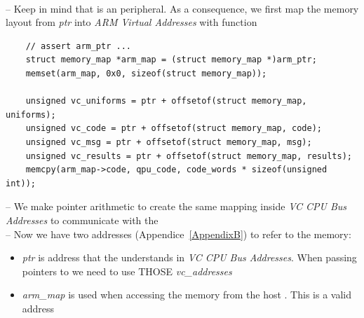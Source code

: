 \\
-- Keep in mind that \vc{} is an \cpu{} peripheral. As a consequence, we first map the memory layout from \emph{ptr} into \emph{ARM Virtual Addresses} with  function\\

\begin{lstlisting}
    // assert arm_ptr ...
    struct memory_map *arm_map = (struct memory_map *)arm_ptr;
    memset(arm_map, 0x0, sizeof(struct memory_map));

    unsigned vc_uniforms = ptr + offsetof(struct memory_map, uniforms);
    unsigned vc_code = ptr + offsetof(struct memory_map, code);
    unsigned vc_msg = ptr + offsetof(struct memory_map, msg);
    unsigned vc_results = ptr + offsetof(struct memory_map, results);
    memcpy(arm_map->code, qpu_code, code_words * sizeof(unsigned int));
\end{lstlisting}
-- We make pointer arithmetic to create the same mapping inside \emph{VC CPU Bus Addresses} to communicate with the \\
-- Now we have two addresses (Appendice~\ref{AppendixB}) to refer to the memory:
\begin{itemize}
\item \emph{ptr} is address that the \vc{} understands in \emph{VC CPU Bus Addresses}. When passing pointers to  we need to use THOSE \emph{vc\_addresses}
\item \emph{arm\_map} is used when accessing the memory from the host \cpu. This is a valid  address
\end{itemize}

